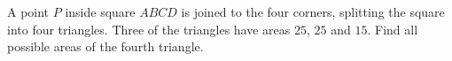 A point $P$ inside square $ABCD$ is joined to the four corners, splitting the square into four triangles. Three of the triangles have areas $25$, $25$ and $15$. Find all possible areas of the fourth triangle.
